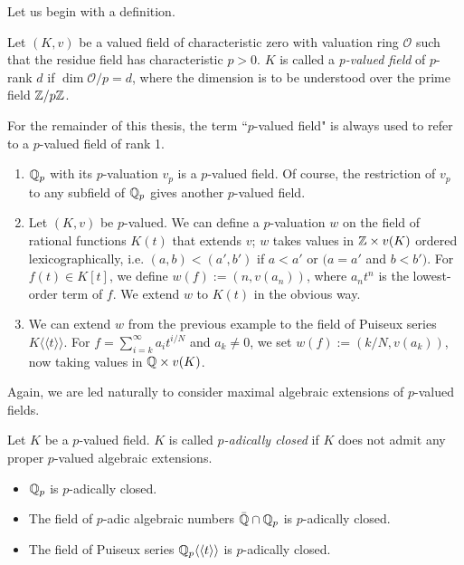 Let us begin with a definition.

\begin{definition}
Let $(K,v)$ be a valued field of characteristic zero with valuation ring $\mathcal{O}$ such that the residue field has characteristic $p>0$. $K$ is called a \emph{p-valued field} of $p$-rank $d$ if $\dim \mathcal{O}/p=d$, where the dimension is to be understood over the prime field $\mathbb{Z}/p\mathbb{Z}$.
\end{definition}

For the remainder of this thesis, the term ``$p$-valued field" is always used to refer to a $p$-valued field of rank 1.

\begin{example}
	\begin{enumerate}
		\item $\mathbb{Q}_p$ with its $p$-valuation $v_p$ is a $p$-valued field. Of course, the restriction of $v_p$ to any subfield of $\mathbb{Q}_p$ gives another $p$-valued field.
		\item Let $(K,v)$ be $p$-valued. We can define a $p$-valuation $w$ on the field of rational functions $K(t)$ that extends $v$; $w$ takes values in $\mathbb{Z}\times v(K)$ ordered lexicographically, i.e. $(a,b)<(a',b')$ if $a<a'$ or $(a=a'$ and $b<b')$. For $f(t)\in K[t]$, we define $w(f):=(n,v(a_n))$, where $a_nt^n$ is the lowest-order term of $f$. We extend $w$ to $K(t)$ in the obvious way.
		\item We can extend $w$ from the previous example to the field of Puiseux series $K\langle\langle t\rangle\rangle$. For $f=\sum_{i=k}^{\infty} a_it^{i/N}$ and $a_k\neq 0$, we set $w(f):=(k/N, v(a_k))$, now taking values in $\mathbb{Q}\times v(K)$.
	\end{enumerate}
\end{example}

Again, we are led naturally to consider maximal algebraic extensions of $p$-valued fields. 
\begin{definition}
Let $K$ be a $p$-valued field. $K$ is called \emph{$p$-adically closed} if $K$ does not admit any proper $p$-valued algebraic extensions.
\end{definition}

\begin{example}
	\begin{itemize}
		\item $\mathbb{Q}_p$ is $p$-adically closed.
		\item The field of $p$-adic algebraic numbers $\bar{\mathbb{Q}}\cap \mathbb{Q}_p$ is $p$-adically closed.
		\item The field of Puiseux series $\mathbb{Q}_p\langle\langle t\rangle\rangle$ is $p$-adically closed.
	\end{itemize}
\end{example}

